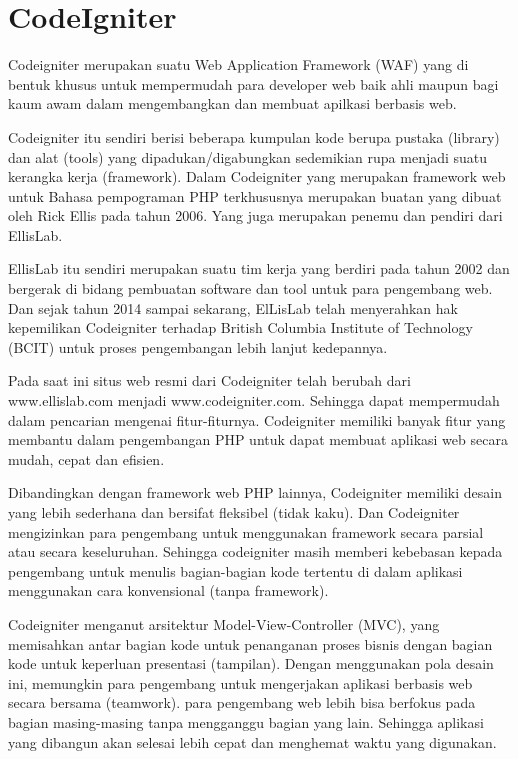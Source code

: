 \section{CodeIgniter}
Codeigniter merupakan suatu Web Application Framework (WAF) yang di bentuk khusus untuk mempermudah para developer web baik ahli maupun bagi kaum awam dalam mengembangkan dan membuat apilkasi berbasis web.
\par
Codeigniter itu sendiri berisi beberapa kumpulan kode berupa pustaka (library) dan alat (tools) yang dipadukan/digabungkan sedemikian rupa menjadi suatu kerangka kerja (framework). Dalam Codeigniter yang merupakan framework web untuk Bahasa pempograman PHP terkhususnya merupakan buatan yang dibuat oleh Rick Ellis pada tahun 2006. Yang juga merupakan penemu dan pendiri dari EllisLab.
\par
EllisLab itu sendiri merupakan suatu tim kerja yang berdiri pada tahun 2002 dan bergerak di bidang pembuatan software dan tool untuk para pengembang web. Dan sejak tahun 2014 sampai sekarang, ElLisLab telah menyerahkan hak kepemilikan Codeigniter terhadap British Columbia Institute of Technology (BCIT) untuk proses pengembangan lebih lanjut kedepannya.
\par
Pada saat ini situs web resmi dari Codeigniter telah berubah dari www.ellislab.com menjadi www.codeigniter.com. Sehingga dapat mempermudah dalam pencarian mengenai fitur-fiturnya. Codeigniter memiliki banyak fitur  yang membantu dalam pengembangan PHP untuk dapat membuat aplikasi web secara mudah, cepat dan efisien.
\par
Dibandingkan dengan framework web PHP lainnya, Codeigniter memiliki desain yang lebih sederhana dan bersifat fleksibel (tidak kaku). Dan Codeigniter mengizinkan para pengembang untuk menggunakan framework secara parsial atau secara keseluruhan. Sehingga codeigniter masih memberi kebebasan kepada pengembang untuk menulis bagian-bagian kode tertentu di dalam aplikasi menggunakan cara konvensional (tanpa framework).
\par
Codeigniter menganut arsitektur Model-View-Controller (MVC), yang memisahkan antar bagian kode untuk penanganan proses bisnis dengan bagian kode untuk keperluan presentasi (tampilan). Dengan menggunakan pola desain ini, memungkin para pengembang untuk mengerjakan aplikasi berbasis web secara bersama (teamwork). para pengembang web lebih bisa berfokus pada bagian masing-masing tanpa mengganggu bagian yang lain. Sehingga aplikasi yang dibangun akan selesai lebih cepat dan menghemat waktu yang digunakan.   


